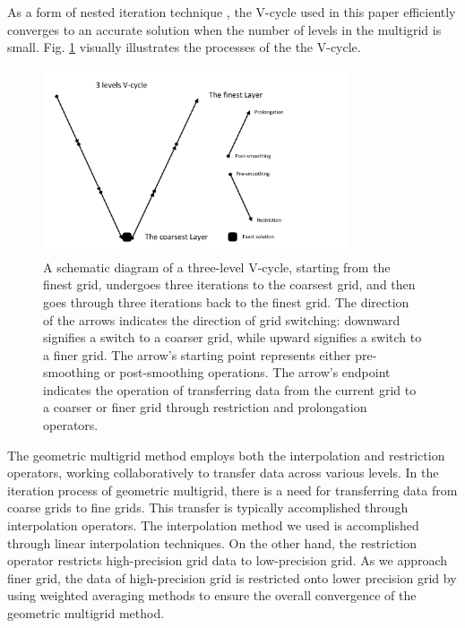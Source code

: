 \documentclass[extra, referee]{gji}
\begin{document}
As a form of nested iteration technique  \citep{SungLim2000}, the V-cycle
\citep{Chen2019,Ha2021} used in this paper efficiently converges to an accurate
solution when the number of levels in the multigrid is small. Fig.
\ref{fig:Vcycle} visually illustrates the processes of the the V-cycle.
\begin{figure}
  \centering
  \includegraphics[width=0.8\textwidth]{fig/Vcycle.pdf}
  \caption{A schematic diagram of a three-level V-cycle, starting from the
    finest grid, undergoes three iterations to the coarsest grid, and then goes
    through three iterations back to the finest grid. The direction of the
    arrows indicates the direction of grid switching: downward signifies a
    switch to a coarser grid, while upward signifies a switch to a finer grid.
    The arrow's starting point represents either pre-smoothing or post-smoothing
    operations. The arrow's endpoint indicates the operation of transferring
    data from the current grid to a coarser or finer grid through restriction
    and prolongation operators.}
  \label{fig:Vcycle}
\end{figure}
The geometric multigrid method employs both the interpolation and restriction
operators, working collaboratively to transfer data across various levels. In
the iteration process of geometric multigrid, there is a need for transferring
data from coarse grids to fine grids. This transfer is typically accomplished
through interpolation operators. The interpolation method we used is
accomplished through linear interpolation techniques. On the other hand, the
restriction operator restricts high-precision grid data to low-precision grid.
As we approach finer grid, the data of high-precision grid is restricted  onto
lower precision grid by using weighted averaging methods to ensure the overall
convergence of the geometric multigrid method.
\end{document}
